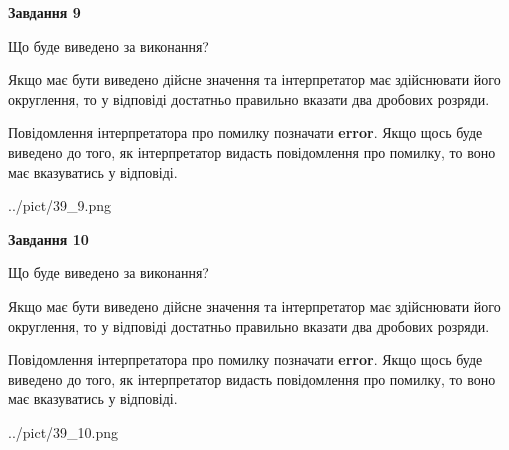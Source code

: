 \documentclass[12pt, ukrainian]{article}
\begin{document}
{\begin {Large}
{\begin {center}\textbf{Завдання 9}\end {center}}\par
Що буде виведено за виконання? \par

Якщо має бути виведено дійсне значення та інтерпретатор має здійснювати його округлення, 
то у відповіді достатньо правильно вказати два дробових розряди.

Повідомлення інтерпретатора про помилку позначати \textbf{error}.
Якщо щось буде виведено до того, як інтерпретатор видасть повідомлення про помилку, 
то воно має вказуватись у відповіді. \par

\begin{center}
	{../pict/39_9.png}
\end{center}
\newpage

{\begin {center}\textbf{Завдання 10}\end {center}}\par
Що буде виведено за виконання? \par

Якщо має бути виведено дійсне значення та інтерпретатор має здійснювати його округлення, 
то у відповіді достатньо правильно вказати два дробових розряди.

Повідомлення інтерпретатора про помилку позначати \textbf{error}.
Якщо щось буде виведено до того, як інтерпретатор видасть повідомлення про помилку, 
то воно має вказуватись у відповіді. \par

\begin{center}
	{../pict/39_10.png}
\end{center}
\newpage

\end {Large}}
\end{document}
